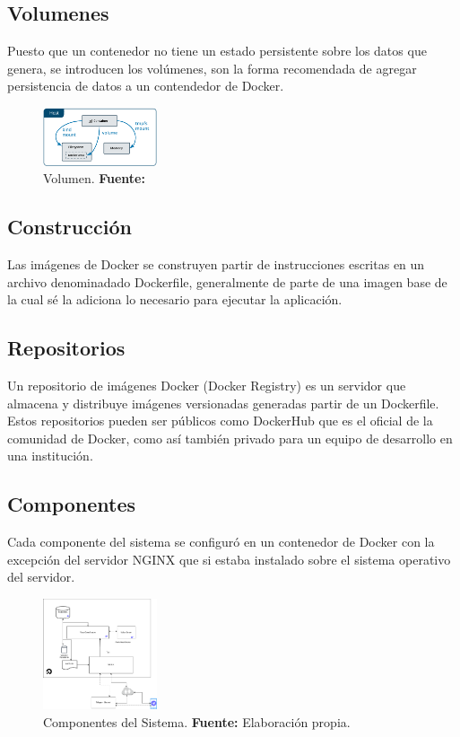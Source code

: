 \subsection{Volumenes}
Puesto que un contenedor no tiene un estado persistente sobre los datos que genera, se introducen
los volúmenes, son la forma recomendada de agregar persistencia de datos a un contendedor de Docker. \cite{Docker}
\begin{figure}[H]
\begin{centering}
\includegraphics[angle=0,width=0.3\textwidth]{Figuras/docker-volume.png}
\par \end{centering}
\caption[Volumen]{Volumen. \textbf{Fuente:} \cite{Docker}}
\label{Volumen}
\end{figure}

\subsection{Construcción}
Las imágenes de Docker se construyen partir de instrucciones escritas en un archivo denominadado Dockerfile, generalmente de parte de una imagen base de la cual sé la adiciona lo necesario para ejecutar la aplicación.
\cite{Docker}

\subsection{Repositorios}
Un repositorio de imágenes Docker (Docker Registry) es un servidor que almacena y distribuye imágenes versionadas generadas partir de un Dockerfile. Estos repositorios pueden ser públicos como
DockerHub que es el oficial de la comunidad de Docker, como así también privado para un equipo de
desarrollo en una institución. \cite{Docker}

\subsection{Componentes}
Cada componente del sistema se configuró en un contenedor de Docker con la excepción del servidor NGINX que si estaba instalado sobre el sistema operativo del servidor. 
\begin{figure}[H]
\begin{centering}
\includegraphics[angle=0,width=0.3\textwidth]{Figuras/server.png}
\par \end{centering}
\caption[Componentes del Sistema]{Componentes del Sistema. \textbf{Fuente:} Elaboración propia.}
\label{Componentes}
\end{figure}

